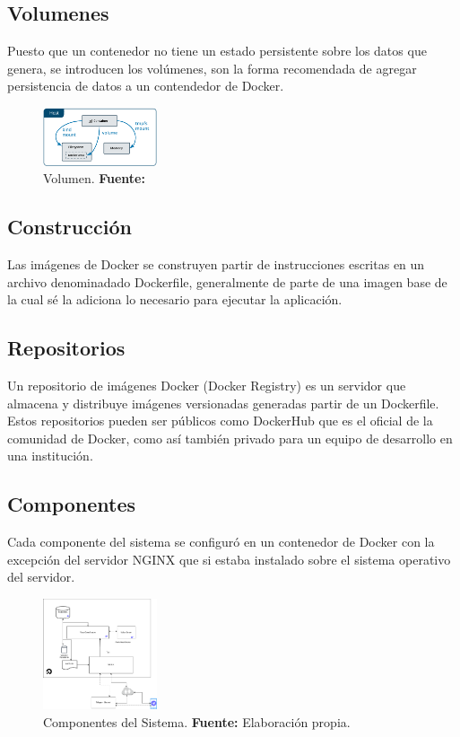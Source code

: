 \subsection{Volumenes}
Puesto que un contenedor no tiene un estado persistente sobre los datos que genera, se introducen
los volúmenes, son la forma recomendada de agregar persistencia de datos a un contendedor de Docker. \cite{Docker}
\begin{figure}[H]
\begin{centering}
\includegraphics[angle=0,width=0.3\textwidth]{Figuras/docker-volume.png}
\par \end{centering}
\caption[Volumen]{Volumen. \textbf{Fuente:} \cite{Docker}}
\label{Volumen}
\end{figure}

\subsection{Construcción}
Las imágenes de Docker se construyen partir de instrucciones escritas en un archivo denominadado Dockerfile, generalmente de parte de una imagen base de la cual sé la adiciona lo necesario para ejecutar la aplicación.
\cite{Docker}

\subsection{Repositorios}
Un repositorio de imágenes Docker (Docker Registry) es un servidor que almacena y distribuye imágenes versionadas generadas partir de un Dockerfile. Estos repositorios pueden ser públicos como
DockerHub que es el oficial de la comunidad de Docker, como así también privado para un equipo de
desarrollo en una institución. \cite{Docker}

\subsection{Componentes}
Cada componente del sistema se configuró en un contenedor de Docker con la excepción del servidor NGINX que si estaba instalado sobre el sistema operativo del servidor. 
\begin{figure}[H]
\begin{centering}
\includegraphics[angle=0,width=0.3\textwidth]{Figuras/server.png}
\par \end{centering}
\caption[Componentes del Sistema]{Componentes del Sistema. \textbf{Fuente:} Elaboración propia.}
\label{Componentes}
\end{figure}

